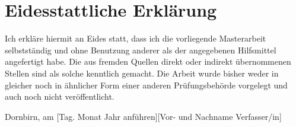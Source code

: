\documentclass[a4paper,12pt,twoside]{scrreprt}
\begin{document}










\clearpage
{}
\printbibliography{}



\chapter*{Eidesstattliche Erklärung}
Ich erkläre hiermit an Eides statt, dass ich die vorliegende Masterarbeit selbstständig und ohne Benutzung anderer als der angegebenen Hilfsmittel angefertigt habe. Die aus fremden Quellen direkt oder indirekt übernommenen Stellen sind als solche kenntlich gemacht. Die Arbeit wurde bisher weder in gleicher noch in ähnlicher Form einer anderen Prüfungsbehörde vorgelegt und auch noch nicht veröffentlicht.

\vspace{3cm}
\noindent
Dornbirn, am [Tag. Monat Jahr anführen]\hfill [Vor- und Nachname Verfasser/in]
\end{document}
